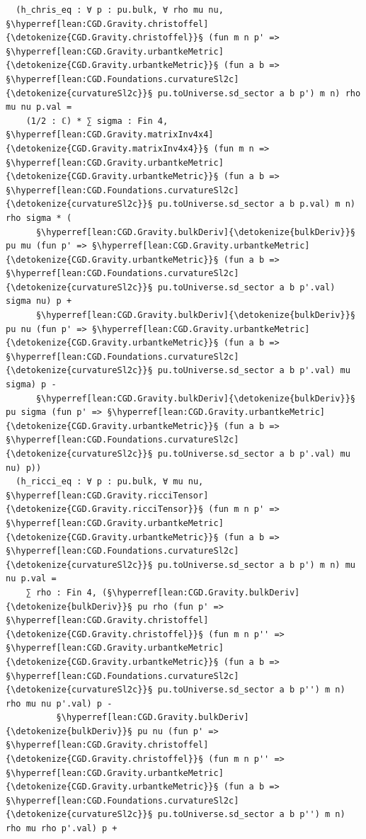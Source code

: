 \begin{verbatim}
  (h_chris_eq : ∀ p : pu.bulk, ∀ rho mu nu, §\hyperref[lean:CGD.Gravity.christoffel]{\detokenize{CGD.Gravity.christoffel}}§ (fun m n p' => §\hyperref[lean:CGD.Gravity.urbantkeMetric]{\detokenize{CGD.Gravity.urbantkeMetric}}§ (fun a b => §\hyperref[lean:CGD.Foundations.curvatureSl2c]{\detokenize{curvatureSl2c}}§ pu.toUniverse.sd_sector a b p') m n) rho mu nu p.val =
    (1/2 : ℂ) * ∑ sigma : Fin 4, §\hyperref[lean:CGD.Gravity.matrixInv4x4]{\detokenize{CGD.Gravity.matrixInv4x4}}§ (fun m n => §\hyperref[lean:CGD.Gravity.urbantkeMetric]{\detokenize{CGD.Gravity.urbantkeMetric}}§ (fun a b => §\hyperref[lean:CGD.Foundations.curvatureSl2c]{\detokenize{curvatureSl2c}}§ pu.toUniverse.sd_sector a b p.val) m n) rho sigma * (
      §\hyperref[lean:CGD.Gravity.bulkDeriv]{\detokenize{bulkDeriv}}§ pu mu (fun p' => §\hyperref[lean:CGD.Gravity.urbantkeMetric]{\detokenize{CGD.Gravity.urbantkeMetric}}§ (fun a b => §\hyperref[lean:CGD.Foundations.curvatureSl2c]{\detokenize{curvatureSl2c}}§ pu.toUniverse.sd_sector a b p'.val) sigma nu) p +
      §\hyperref[lean:CGD.Gravity.bulkDeriv]{\detokenize{bulkDeriv}}§ pu nu (fun p' => §\hyperref[lean:CGD.Gravity.urbantkeMetric]{\detokenize{CGD.Gravity.urbantkeMetric}}§ (fun a b => §\hyperref[lean:CGD.Foundations.curvatureSl2c]{\detokenize{curvatureSl2c}}§ pu.toUniverse.sd_sector a b p'.val) mu sigma) p -
      §\hyperref[lean:CGD.Gravity.bulkDeriv]{\detokenize{bulkDeriv}}§ pu sigma (fun p' => §\hyperref[lean:CGD.Gravity.urbantkeMetric]{\detokenize{CGD.Gravity.urbantkeMetric}}§ (fun a b => §\hyperref[lean:CGD.Foundations.curvatureSl2c]{\detokenize{curvatureSl2c}}§ pu.toUniverse.sd_sector a b p'.val) mu nu) p))
  (h_ricci_eq : ∀ p : pu.bulk, ∀ mu nu, §\hyperref[lean:CGD.Gravity.ricciTensor]{\detokenize{CGD.Gravity.ricciTensor}}§ (fun m n p' => §\hyperref[lean:CGD.Gravity.urbantkeMetric]{\detokenize{CGD.Gravity.urbantkeMetric}}§ (fun a b => §\hyperref[lean:CGD.Foundations.curvatureSl2c]{\detokenize{curvatureSl2c}}§ pu.toUniverse.sd_sector a b p') m n) mu nu p.val =
    ∑ rho : Fin 4, (§\hyperref[lean:CGD.Gravity.bulkDeriv]{\detokenize{bulkDeriv}}§ pu rho (fun p' => §\hyperref[lean:CGD.Gravity.christoffel]{\detokenize{CGD.Gravity.christoffel}}§ (fun m n p'' => §\hyperref[lean:CGD.Gravity.urbantkeMetric]{\detokenize{CGD.Gravity.urbantkeMetric}}§ (fun a b => §\hyperref[lean:CGD.Foundations.curvatureSl2c]{\detokenize{curvatureSl2c}}§ pu.toUniverse.sd_sector a b p'') m n) rho mu nu p'.val) p -
          §\hyperref[lean:CGD.Gravity.bulkDeriv]{\detokenize{bulkDeriv}}§ pu nu (fun p' => §\hyperref[lean:CGD.Gravity.christoffel]{\detokenize{CGD.Gravity.christoffel}}§ (fun m n p'' => §\hyperref[lean:CGD.Gravity.urbantkeMetric]{\detokenize{CGD.Gravity.urbantkeMetric}}§ (fun a b => §\hyperref[lean:CGD.Foundations.curvatureSl2c]{\detokenize{curvatureSl2c}}§ pu.toUniverse.sd_sector a b p'') m n) rho mu rho p'.val) p +

\end{verbatim}
